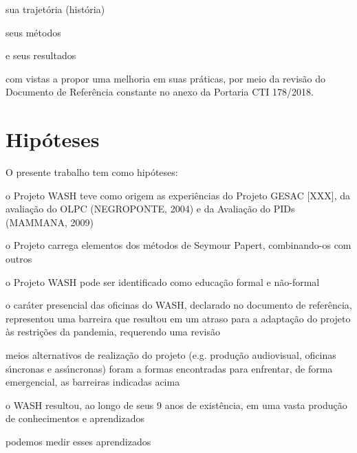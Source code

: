 \documentclass[
12pt,		%
openright,	%
twoside,  %
a4paper,			%
chapter=TITLE,		%
english,			%
french,				%
spanish,			%
brazil				%
]{USPSC-classe/USPSC_RedarTex}
\begin{document}
\begin{alineas}
\item sua trajet\'oria (hist\'oria)
\item seus m\'etodos
\item e seus resultados
\end{alineas}

com vistas a propor uma melhoria em suas pr\'aticas, por meio da revis\~ao do Documento de Refer\^encia constante no anexo da Portaria CTI 178/2018.








\section[Hip\'oteses]{Hip\'oteses}\label{Hip\'oteses}
O presente trabalho tem como hip\'oteses:









\begin{alineas}
\item o Projeto WASH teve como origem as experi\^encias do Projeto GESAC [XXX], da avalia\c{c}\~ao do OLPC (NEGROPONTE, 2004) e da Avalia\c{c}\~ao do PIDs (MAMMANA, 2009)
\item o Projeto carrega elementos dos m\'etodos de Seymour Papert, combinando-os com outros
\item o Projeto WASH pode ser identificado como \textquotedbl educa\c{c}\~ao  formal e n\~ao-formal
\item o car\'ater presencial das oficinas do WASH, declarado no documento de refer\^encia, representou uma barreira que resultou em um atraso para a adapta\c{c}\~ao do projeto \`as restri\c{c}\~oes da pandemia, requerendo uma revis\~ao
\item meios alternativos de realiza\c{c}\~ao do projeto (e.g. produ\c{c}\~ao audiovisual, oficinas s\'{\i}ncronas e ass\'{\i}ncronas) foram a formas encontradas para enfrentar, de forma emergencial, as barreiras indicadas acima
\item o WASH resultou, ao longo de seus 9 anos de exist\^encia, em uma vasta produ\c{c}\~ao de conhecimentos e aprendizados
\item podemos medir  esses aprendizados 
\end{alineas}
\end{document}
